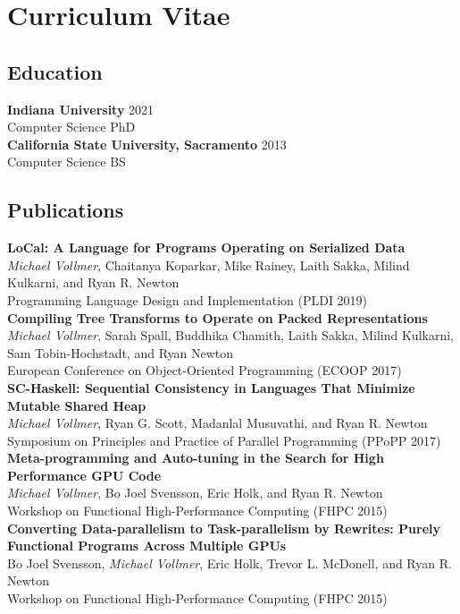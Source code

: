 \chapter*{Curriculum Vitae}
\setlength{\parindent}{0pt}

\section*{Education}
\textbf{Indiana University} \hfill 2021 \\
Computer Science PhD  \\
\textbf{California State University, Sacramento} \hfill 2013 \\
Computer Science BS  \\
\thispagestyle{empty}

\section*{Publications}
{\bf LoCal: A Language for Programs Operating on Serialized Data} \\
\emph{Michael Vollmer}, Chaitanya Koparkar, Mike Rainey, Laith Sakka, Milind Kulkarni, and Ryan R. Newton \\
Programming Language Design and Implementation (PLDI 2019) \\
 {\bf Compiling Tree Transforms to Operate on Packed Representations}\\
\emph{Michael Vollmer}, Sarah Spall, Buddhika Chamith, Laith Sakka, Milind Kulkarni, Sam Tobin-Hochstadt, and Ryan Newton \\
European Conference on Object-Oriented Programming (ECOOP 2017) \\
{\bf SC-Haskell: Sequential Consistency in Languages That Minimize Mutable Shared Heap}  \\
\emph{Michael Vollmer}, Ryan G. Scott, Madanlal Musuvathi, and Ryan R. Newton \\
Symposium on Principles and Practice of Parallel Programming (PPoPP 2017) \\
{\bf Meta-programming and Auto-tuning in the Search for High Performance GPU Code}  \\
\emph{Michael Vollmer}, Bo Joel Svensson, Eric Holk, and Ryan R. Newton \\
Workshop on Functional High-Performance Computing (FHPC 2015) \\
{\bf Converting Data-parallelism to Task-parallelism by Rewrites: Purely Functional Programs Across Multiple GPUs} \\
Bo Joel Svensson, \emph{Michael Vollmer}, Eric Holk, Trevor L. McDonell, and Ryan R. Newton \\
Workshop on Functional High-Performance Computing (FHPC 2015) \\

\thispagestyle{empty}
